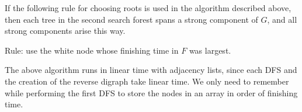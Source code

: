 \begin{Theorem} \label{thm:scc-alg} 
If the following rule for choosing roots is used in the algorithm
described above, then each tree in the second search forest spans a
strong component of $G$, and all strong components arise this way.

Rule: use the white node whose finishing time in $F$ was largest.
\end{Theorem}

%

The above algorithm runs in linear time with adjacency lists, since each
DFS and the creation of the reverse digraph take linear time. We only
need to remember  while performing the first DFS to store the nodes in
an array in order of finishing time. 

%
%



